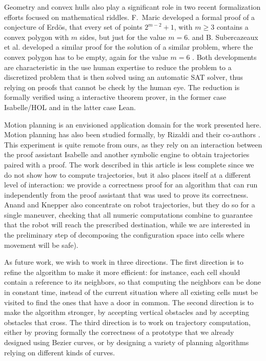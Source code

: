 \documentclass[a4paper, USenglish, cleveref, autoref, thm-restate, final]{lipics-v2021}
\begin{document}
Geometry and convex hulls also play a significant role in two recent
formalization efforts focused on mathematical riddles.  F.~Maric
developed a formal proof of a conjecture of Erdös, that every set of
points \(2 ^ {m - 2} +1\), with \(m \geq 3\) contains a convex polygon
with \(m\) sides, but just for the value \(m = 6\).
\cite{Maric2019} and B. Subercazeaux et al. developed a similar proof
for the solution of a similar problem, where the convex polygon has to
be empty, again for the value \(m = 6\)
\cite{subercaseaux_et_al:LIPIcs.ITP.2024.35}.  Both developments are
characteristic in the use human expertise to reduce the problem to a
discretized problem that is then solved using an automatic SAT solver,
thus relying on proofs that cannot be check by the human eye.  The
reduction is formally verified using a interactive theorem prover, in
the former case Isabelle/HOL and in the latter case Lean.

Motion planning is an envisioned application domain for the work presented
here.  Motion planning has also been studied formally, by Rizaldi and 
their co-authors \cite{Rizaldietal18}.  This experiment is quite remote from
ours, as they rely on an interaction between the proof assistant {\sc Isabelle}
and another symbolic engine to obtain trajectories paired with a proof.  The
work described in this article is less complete since we do not show how
to compute trajectories, but it also places itself at a different level of
interaction: we provide a correctness proof for an algorithm that can run
independently from the proof assistant that was used to prove its correctness.
Anand and Knepper \cite{AnandRoscoq15} also concentrate on robot
trajectories, but they do so for a single maneuver, checking that all
numeric computations combine to guarantee that the robot will reach the
prescribed destination, while we are interested in the preliminary step
of decomposing the configuration space into cells where movement will be safe).

As future work, we wish to work in three directions.  The first direction
is to refine the algorithm to make it more efficient: for instance,
each cell should contain a reference to its neighbors, so that computing
the neighbors can be done in constant time, instead of the current situation
where all existing cells must be visited to find the ones that have a door
in common.  The second direction is to make the algorithm stronger, 
by accepting vertical obstacles and by accepting obstacles that cross.
The third direction is to work on trajectory computation, either by proving
formally the correctness of a prototype that we already designed using
Bezier curves, or by
designing a variety of planning algorithms relying on different kinds
of curves.

\end{document}
